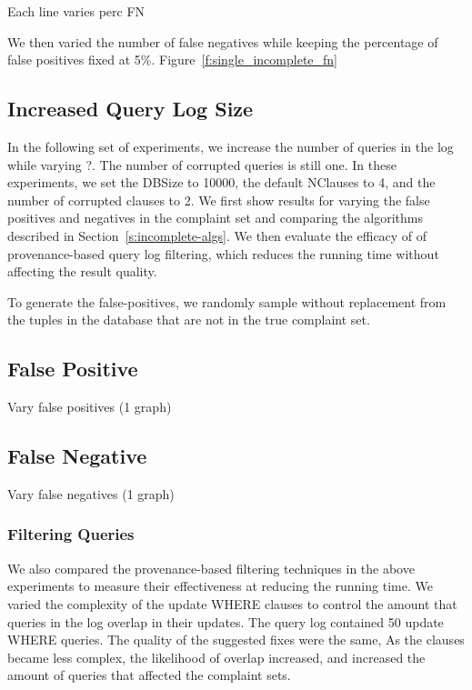 Each line varies perc FN

We then varied the number of false negatives while keeping the percentage of false positives fixed at 5\%.
Figure~\ref{f:single_incomplete_fn} 


\subsection{Increased Query Log Size}

In the following set of experiments, we increase the number of
queries in the log while varying ?.  The number of corrupted queries
is still one.  In these experiments, we set the DBSize to 10000,
the default NClauses to 4, and the number of corrupted clauses to
2.   We first show results for varying the false positives and
negatives in the complaint set and comparing the algorithms described
in Section~\ref{s:incomplete-algs}.  We then evaluate the efficacy
of of provenance-based query log filtering, which reduces the running
time without affecting the result quality.

To generate the false-positives, we randomly sample without replacement
from the tuples in the database that are not in the true complaint
set.

\subsection{False Positive}

Vary false positives (1 graph)


\subsection{False Negative}

Vary false negatives (1 graph)

\subsubsection{Filtering Queries}

We also compared the provenance-based filtering techniques in the above experiments
to measure their effectiveness at reducing the running time.  We varied the complexity of the update 
WHERE clauses to control the amount that queries in the log overlap in their updates.  The query log contained 50 update WHERE queries.
The quality of the suggested fixes were the same,  As the clauses became less complex, the likelihood 
of overlap increased, and increased the amount of queries that affected the complaint sets.


